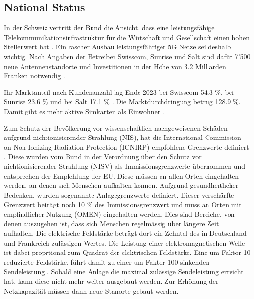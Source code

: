 \subsection{National Status}
\begin{German}
    In der Schweiz vertritt der Bund die Ansicht, dass eine leistungsfähige Telekommunikationsinfrastruktur für die Wirtschaft und Gesellschaft einen hohen Stellenwert hat \cite{bundesratNachhaltigesMobilfunknetzBericht2022}. Ein rascher Ausbau leistungsfähriger 5G Netze sei deshalb wichtig. Nach Angaben der Betreiber Swisscom, Sunrise und Salt sind dafür 7'500 neue Antennenstandorte und Investitionen in der Höhe von 3.2 Milliarden Franken notwendig \cite{bundesratNachhaltigesMobilfunknetzBericht2022}.

    Ihr Marktanteil nach Kundenanzahl lag Ende 2023 bei Swisscom 54.3 \%, bei Sunrise 23.6 \% und bei Salt 17.1 \% \cite{bakomMarktanteileMobilfunknetz}. Die Marktdurchdringung betrug 128.9 \%. Damit gibt es mehr aktive Simkarten als Einwohner \cite{bakomAnzahlMobilfunkkundinnenUnd}.

    Zum Schutz der Bevölkerung vor wissenschaftlich nachgeweisenen Schäden aufgrund nichtionisierender Strahlung (NIS), hat die International Commission on Non-Ionizing Radiation Protection (ICNIRP) empfohlene Grenzwerte definiert \cite{baumannMitVerordnungUeber2005}. Diese wurden vom Bund in der Verordnung über den Schutz vor nichtionisierender Strahlung (NISV) als Immissionsgrenzwerte übernommen und entsprechen der Empfehlung der EU. Diese müssen an allen Orten eingehalten werden, an denen sich Menschen aufhalten können. Aufgrund gesundheitlicher Bedenken, wurden sogenannte Anlagegrenzwerte definiert. Dieser verschärfte Grenzwert beträgt noch 10 \% des Immissionsgrenzwert und muss an Orten mit empfindlicher Nutzung (OMEN) eingehalten werden. Dies sind Bereiche, von denen auszugehen ist, dass sich Menschen regelmässig über längere Zeit aufhalten. Die elektrische Feldstärke beträgt dort ein Zehntel des in Deutschland und Frankreich zulässigen Wertes. Die Leistung einer elektromagnetischen Welle ist dabei proprtional zum Quadrat der elektrischen Feldstärke. Eine um Faktor 10 reduzierte Feldstärke, führt damit zu einer um Faktor 100 sinkenden Sendeleistung \cite{chance5gAnlagegrenzwerteImMobilfunk}.
    Sobald eine Anlage die maximal zulässige Sendeleistung erreicht hat, kann diese nicht mehr weiter ausgebaut werden. Zur Erhöhung der Netzkapazität müssen dann neue Stanorte gebaut werden. \cite{bundesratNachhaltigesMobilfunknetzBericht2022}
\end{German}

